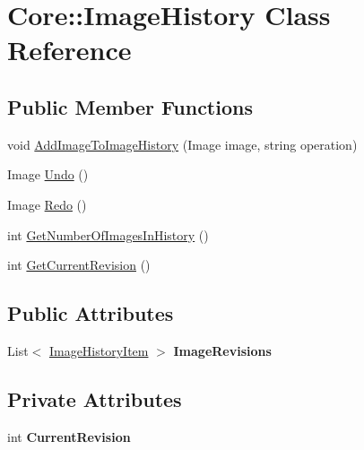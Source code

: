 \hypertarget{class_core_1_1_image_history}{
\section{Core::ImageHistory Class Reference}
\label{class_core_1_1_image_history}
}
\subsection*{Public Member Functions}
\begin{DoxyCompactItemize}
\item 
void \hyperlink{class_core_1_1_image_history_a6631d7fefea3a1a28fc6dcdf887daf37}{AddImageToImageHistory} (Image image, string operation)
\item 
Image \hyperlink{class_core_1_1_image_history_ade2a92df5f5525b0e3951b45b2f3434e}{Undo} ()
\item 
Image \hyperlink{class_core_1_1_image_history_afc601ae64181e745d9d94f4b16633a90}{Redo} ()
\item 
int \hyperlink{class_core_1_1_image_history_ae26bcfeed34a733dd372896a86bbc3d4}{GetNumberOfImagesInHistory} ()
\item 
int \hyperlink{class_core_1_1_image_history_a421e672ff9f20e10a03bf989cff4442e}{GetCurrentRevision} ()
\end{DoxyCompactItemize}
\subsection*{Public Attributes}
\begin{DoxyCompactItemize}
\item 
\hypertarget{class_core_1_1_image_history_abb81d12e0bcf3f1f0e79c797f38cc6f2}{
List$<$ \hyperlink{class_core_1_1_image_history_item}{ImageHistoryItem} $>$ {\bfseries ImageRevisions}}
\label{class_core_1_1_image_history_abb81d12e0bcf3f1f0e79c797f38cc6f2}

\end{DoxyCompactItemize}
\subsection*{Private Attributes}
\begin{DoxyCompactItemize}
\item 
\hypertarget{class_core_1_1_image_history_a1a695f64608fc10b95bce32634092f3c}{
int {\bfseries CurrentRevision}}
\label{class_core_1_1_image_history_a1a695f64608fc10b95bce32634092f3c}

\end{DoxyCompactItemize}



